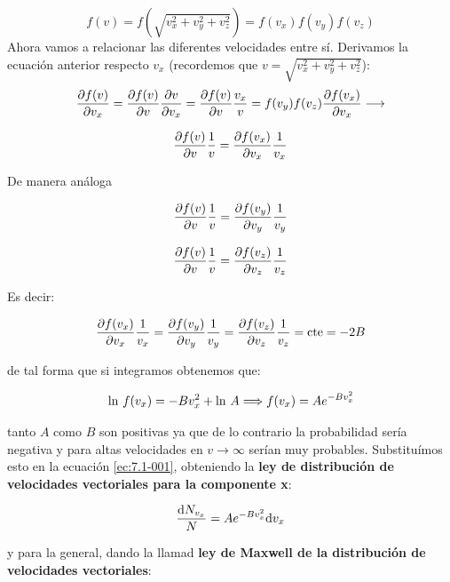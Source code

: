 \documentclass[12pt,a4paper,oneside]{book}
\begin{document}
\begin{equation}
f(v) = f(\sqrt{v_x^2 + v_y^2 + v_z^2}) = f(v_x) f(v_y) f(v_z) 
\end{equation}
Ahora vamos a relacionar las diferentes velocidades entre sí. Derivamos la ecuación anterior respecto $v_x$ (recordemos que $v= \sqrt{v_x^2 + v_y^2 + v_z^2}$):
$$
 \frac{\partial f(v)}{\partial v_x} = \frac{\partial f(v)}{\partial v} \frac{\partial v}{\partial v_x} = \frac{\partial f(v)}{\partial v} \dfrac{v_x}{v} = f(v_y) f(v_z) \frac{\partial f(v_x)}{\partial v_x} \longrightarrow  
$$

\begin{equation}
\frac{\partial f(v)}{\partial v} \dfrac{1}{v} =
\frac{\partial f(v_x)}{\partial v_x} \dfrac{1}{v_x}
\end{equation}


De manera análoga


\begin{equation}
\frac{\partial f(v)}{\partial v} \dfrac{1}{v} = 
\frac{\partial f(v_y)}{\partial v_y} \dfrac{1}{v_y}
\end{equation}


\begin{equation}
\frac{\partial f(v)}{\partial v} \dfrac{1}{v} = 
\frac{\partial f(v_z)}{\partial v_z} \dfrac{1}{v_z}
\end{equation}

Es decir:

\begin{equation}
\frac{\partial f(v_x)}{\partial v_x} \dfrac{1}{v_x} =
\frac{\partial f(v_y)}{\partial v_y} \dfrac{1}{v_y}= 
\frac{\partial f(v_z)}{\partial v_z} \dfrac{1}{v_z} = \mathrm{cte} = - 2B
\end{equation}

de tal forma que si integramos obtenemos que:

\begin{equation}
\mathrm{ln} \  f(v_x) = - B v_x^2 + \mathrm{ln} \  A \Longrightarrow f(v_x) = A e^{- B v_x^2}
\end{equation}

tanto $A$ como $B$ son positivas ya que de lo contrario la probabilidad sería negativa y para altas velocidades en $v \rightarrow \infty$ serían muy probables. Substituímos esto en la ecuación \ref{ec:7.1-001}, obteniendo la \textbf{ley de distribución de velocidades vectoriales para la componente x}:

\begin{equation}
\dfrac{\mathrm{d} N_{v_x}}{N} = A e^{-Bv_x^2} \mathrm{d} v_x  \label{ec:7.1-011}
\end{equation}

y para la general, dando la llamad \textbf{ley de Maxwell de la distribución de velocidades vectoriales}:
\end{document}
